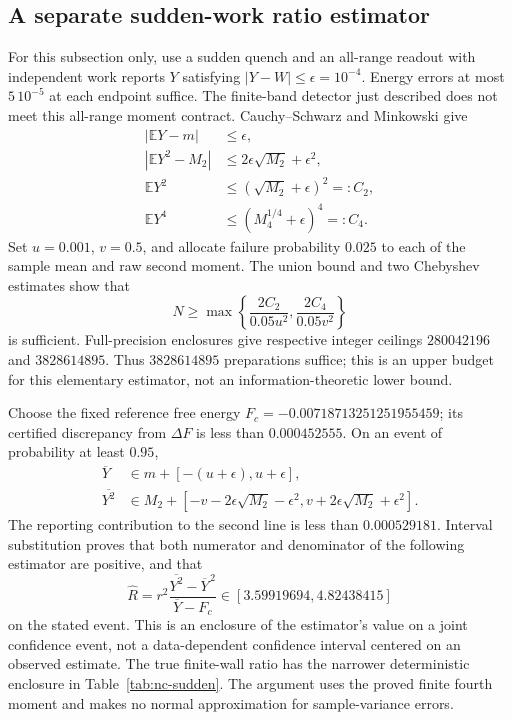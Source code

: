 \documentclass[aps,pra,reprint,superscriptaddress,longbibliography]{revtex4-2}
\newcommand{\E}{\mathbb E}
\begin{document}
\subsection{A separate sudden-work ratio estimator}

For this subsection only, use a sudden quench and an all-range readout
with independent work reports $Y$ satisfying $|Y-W|\le\epsilon=10^{-4}$.
Energy errors at most $5\,10^{-5}$ at each endpoint suffice.
The finite-band detector just described does not meet this all-range
moment contract.  Cauchy--Schwarz and Minkowski give
\begin{align}
 |\E Y-m|&\le\epsilon,\nonumber\\
 |\E Y^2-M_2|&\le2\epsilon\sqrt{M_2}+\epsilon^2,\nonumber\\
 \E Y^2&\le(\sqrt{M_2}+\epsilon)^2=:C_2,\nonumber\\
 \E Y^4&\le(M_4^{1/4}+\epsilon)^4=:C_4.
 \label{eq:nc-reporting-moments}
\end{align}
Set $u=0.001$, $v=0.5$, and allocate failure probability $0.025$
to each of the sample mean and raw second moment.  The union bound
and two Chebyshev estimates show that
\begin{equation}
 N\ge\max\left\{\frac{2C_2}{0.05u^2},
                      \frac{2C_4}{0.05v^2}\right\}
 \label{eq:nc-ratio-count}
\end{equation}
is sufficient.  Full-precision enclosures give respective integer
ceilings $280042196$ and $3828614895$.  Thus $3828614895$
preparations suffice; this is an upper budget for this elementary
estimator, not an information-theoretic lower bound.

Choose the fixed reference free energy
$F_c=-0.00718713251251955459$; its certified discrepancy from
$\Delta F$ is less than $0.000452555$.
On an event of probability at least $0.95$,
\begin{align}
 \overline Y&\in m+[-(u+\epsilon),u+\epsilon],\nonumber\\
 \overline{Y^2}&\in M_2+
 [-v-2\epsilon\sqrt{M_2}-\epsilon^2,
    v+2\epsilon\sqrt{M_2}+\epsilon^2].
 \label{eq:nc-ratio-event}
\end{align}
The reporting contribution to the second line is less than
$0.000529181$.  Interval substitution proves that both numerator and
denominator of the following estimator are positive, and that
\begin{equation}
 \widehat R=
 r^2\frac{\overline{Y^2}-\overline Y^{\,2}}{\overline Y-F_c}
                \in[3.59919694,4.82438415]
 \label{eq:nc-ratio-estimator}
\end{equation}
on the stated event.  This is an enclosure of the estimator's value on
a joint confidence event, not a data-dependent confidence interval
centered on an observed estimate.  The true finite-wall ratio has the
narrower deterministic enclosure in Table~\ref{tab:nc-sudden}.
The argument uses the proved finite fourth moment and makes no normal
approximation for sample-variance errors.
\end{document}
